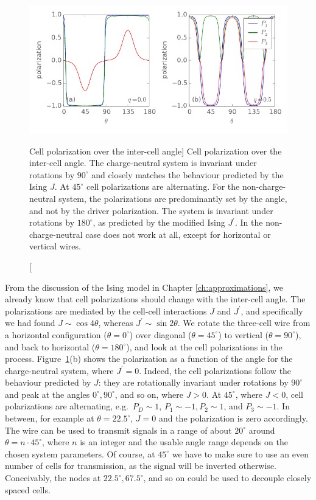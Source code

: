 \begin{figure}
  \center
  \includegraphics{three_cells_P_over_theta}
  \caption
  [Cell polarization over the inter-cell angle]
  {
  Cell polarization over the inter-cell angle. The charge-neutral system is
  invariant under rotations by $90^{\circ}$ and closely matches the behaviour
  predicted by the Ising $J$. At $45^{\circ}$ cell polarizations are
  alternating. For the non-charge-neutral system, the polarizations are
  predominantly set by the angle, and not by the driver polarization. The system
  is invariant under rotations by $180^{\circ}$, as predicted by the modified
  Ising $J^{\prime}$. In the non-charge-neutral case  does not work at
  all, except for horizontal or vertical wires.
  }
  \label{fig:three_cells_P_over_theta}
\end{figure}

From the discussion of the Ising model in Chapter \ref{ch:approximations}, we
already know that cell polarizations should change with the inter-cell angle.
The polarizations are mediated by the cell-cell interactions $J$ and
$J^{\prime}$, and specifically we had found $J \sim \cos{4 \theta}$, whereas
$J^{\prime} \sim \sin{2 \theta}$. We rotate the three-cell wire from a
horizontal configuration ($\theta = 0^{\circ}$) over diagonal ($\theta =
45^{\circ}$) to vertical ($\theta = 90^{\circ}$), and back to horizontal
($\theta = 180^{\circ}$), and look at the cell polarizations in the process.
Figure~\ref{fig:three_cells_P_over_theta}(b) shows the polarization as a function
of the angle for the charge-neutral system, where $J^{\prime} = 0$. Indeed, the
cell polarizations follow the behaviour predicted by $J$: they are rotationally
invariant under rotations by $90^{\circ}$ and peak at the angles $0^{\circ},
90^{\circ}$, and so on, where $J > 0$. At $45^{\circ}$, where $J < 0$, cell
polarizations are alternating, e.g.~$P_D \sim 1$, $P_1 \sim -1, P_2 \sim 1$, and
$P_3 \sim -1$. In between, for example at $\theta = 22.5^{\circ}$, $J = 0$ and
the polarization is zero accordingly. The wire can be used to transmit signals
in a range of about $20^{\circ}$ around $\theta = n \cdot 45^{\circ}$, where $n$
is an integer and the usable angle range depends on the chosen system
parameters. Of course, at $45^{\circ}$ we have to make sure to use an even
number of cells for transmission, as the signal will be inverted otherwise.
Conceivably, the nodes at $22.5^{\circ}, 67.5^{\circ}$, and so on could be used
to decouple closely spaced cells.

